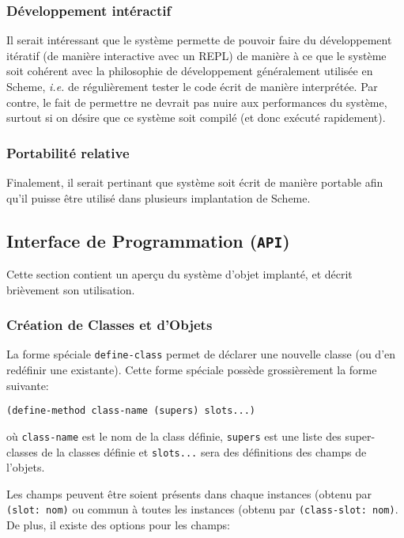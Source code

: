 \documentclass[letterpaper,12pt]{article}
\begin{document}
    \subsubsection{Développement intéractif}
      Il serait intéressant que le système permette de pouvoir faire
      du développement itératif (de manière interactive avec un REPL)
      de manière à ce que le système soit cohérent avec la philosophie
      de développement généralement utilisée en Scheme, \textit{i.e.}
      de régulièrement tester le code écrit de manière interprétée.
      Par contre, le fait de permettre ne devrait pas nuire aux
      performances du système, surtout si on désire que ce système
      soit compilé (et donc exécuté rapidement).

    \subsubsection{Portabilité relative}
      Finalement, il serait pertinant que système soit écrit de
      manière portable afin qu'il puisse être utilisé dans plusieurs
      implantation de Scheme. 


  \subsection{Interface de Programmation (\texttt{API})}
    Cette section contient un aperçu du système d'objet implanté, et
    décrit brièvement son utilisation.
  
    \subsubsection{Création de Classes et d'Objets}
      La forme spéciale \texttt{define-class} permet de déclarer une
      nouvelle classe (ou d'en redéfinir une existante). Cette forme
      spéciale possède grossièrement la forme suivante:

      \begin{lstlisting}
(define-method class-name (supers) slots...)
      \end{lstlisting}

      où \texttt{class-name} est le nom de la class définie,
      \texttt{supers} est une liste des super-classes de la classes
      définie et \texttt{slots...} sera des définitions des champs de
      l'objets.

      Les champs peuvent être soient présents dans chaque instances
      (obtenu par \texttt{(slot: nom)} ou commun à toutes les
      instances (obtenu par \texttt{(class-slot: nom)}. De plus, il
      existe des options pour les champs:
      
\end{document}
